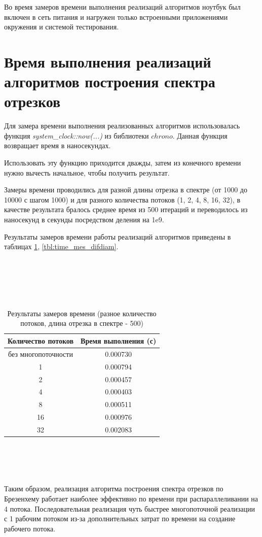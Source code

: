 Во время замеров времени выполнения реализаций алгоритмов ноутбук был включен в сеть питания и нагружен только встроенными приложениями окружения и системой тестирования.

\section{Время выполнения реализаций алгоритмов построения спектра отрезков}
Для замера времени выполнения реализованных алгоритмов использовалась функция \textit{system\_clock::now(...)} из библиотеки $chrono$. Данная функция возвращает время в наносекундах.

Использовать эту функцию приходится дважды, затем из конечного времени нужно вычесть начальное, чтобы получить результат.

Замеры времени проводились для разной длины отрезка в спектре (от 1000 до 10000 с шагом 1000) и для разного количества потоков (1, 2, 4, 8, 16, 32), в качестве результата бралось среднее время из 500 итераций и переводилось из наносекунд в секунды посредством деления на 1e9.

Результаты замеров времени работы реализаций алгоритмов приведены в таблицах \ref{tbl:time_mes_par}, \ref{tbl:time_mes_difdiam}.
\\
\\
\\
\\
\\
\\
\begin{table}[h]
    \begin{center}
        \caption{Результаты замеров времени (разное количество потоков, длина отрезка в спектре - 500)}
        \label{tbl:time_mes_par}
        \begin{tabular}{|c|c|}
            \hline
            Количество потоков & Время выполнения (с) \\
            \hline
            без многопоточности & 0.000730 \\ \hline
            1 & 0.000794 \\ \hline 
            2 & 0.000457 \\ \hline 
            4 & 0.000403 \\ \hline 
            8 & 0.000511 \\ \hline 
            16 & 0.000976 \\ \hline 
            32 & 0.002083 \\ \hline 
		\end{tabular}
\end{center}
\end{table}
\\
\\
\\
\\
\FloatBarrier
Таким образом, реализация алгоритма построения спектра отрезков по Брезенхему работает наиболее эффективно по времени при распараллеливании на 4 потока.
Последовательная реализация чуть быстрее многопоточной реализации с 1 рабочим потоком из-за дополнительных затрат по времени на создание рабочего потока.

